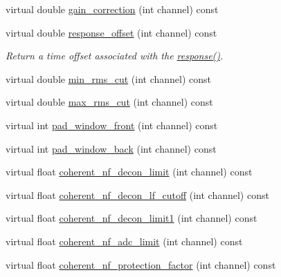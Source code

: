 \begin{DoxyCompactItemize}
virtual double \hyperlink{class_wire_cell_1_1_sig_proc_1_1_omni_channel_noise_d_b_a60802eabcf081d7b82ed7b270dcefe00}{gain\+\_\+correction} (int channel) const
\item 
virtual double \hyperlink{class_wire_cell_1_1_sig_proc_1_1_omni_channel_noise_d_b_a0b6fa7b4d342adf1313b86684b811023}{response\+\_\+offset} (int channel) const
\begin{DoxyCompactList}\small\item\em Return a time offset associated with the \hyperlink{class_wire_cell_1_1_sig_proc_1_1_omni_channel_noise_d_b_ae269e377629b9a96c8e0cdb0f30353a4}{response()}. \end{DoxyCompactList}\item 
virtual double \hyperlink{class_wire_cell_1_1_sig_proc_1_1_omni_channel_noise_d_b_a37f1dda111792a36315f977c2ade5783}{min\+\_\+rms\+\_\+cut} (int channel) const
\item 
virtual double \hyperlink{class_wire_cell_1_1_sig_proc_1_1_omni_channel_noise_d_b_a494d0e48066357d8e86ea7ce4d462bdb}{max\+\_\+rms\+\_\+cut} (int channel) const
\item 
virtual int \hyperlink{class_wire_cell_1_1_sig_proc_1_1_omni_channel_noise_d_b_afc69ca596a5ff6f8a63fc64234c8062e}{pad\+\_\+window\+\_\+front} (int channel) const
\item 
virtual int \hyperlink{class_wire_cell_1_1_sig_proc_1_1_omni_channel_noise_d_b_ac765001725b5a181ccfd605d0221e0ef}{pad\+\_\+window\+\_\+back} (int channel) const
\item 
virtual float \hyperlink{class_wire_cell_1_1_sig_proc_1_1_omni_channel_noise_d_b_ae062cbbc8743dd33840d92589b04821b}{coherent\+\_\+nf\+\_\+decon\+\_\+limit} (int channel) const
\item 
virtual float \hyperlink{class_wire_cell_1_1_sig_proc_1_1_omni_channel_noise_d_b_a43dbea0d5db7c2217f35f7df45dd8b4f}{coherent\+\_\+nf\+\_\+decon\+\_\+lf\+\_\+cutoff} (int channel) const
\item 
virtual float \hyperlink{class_wire_cell_1_1_sig_proc_1_1_omni_channel_noise_d_b_a7c98e373e09268af35e18121d2a173f2}{coherent\+\_\+nf\+\_\+decon\+\_\+limit1} (int channel) const
\item 
virtual float \hyperlink{class_wire_cell_1_1_sig_proc_1_1_omni_channel_noise_d_b_abc80cb5a10e48500824f710c3846900d}{coherent\+\_\+nf\+\_\+adc\+\_\+limit} (int channel) const
\item 
virtual float \hyperlink{class_wire_cell_1_1_sig_proc_1_1_omni_channel_noise_d_b_aa4d6c9f3a30c788683caacf735510ceb}{coherent\+\_\+nf\+\_\+protection\+\_\+factor} (int channel) const

\end{DoxyCompactItemize}
